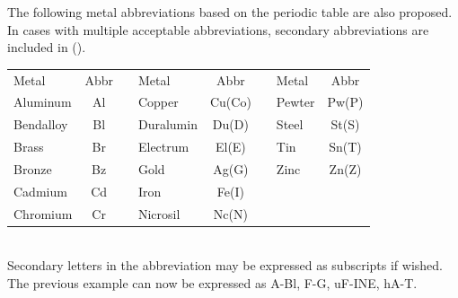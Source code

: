 \documentclass[conference]{IEEEtran}
\newcommand{\n}{\hfill\break}
\begin{document}
The following metal abbreviations based on the periodic table are also proposed.  In cases with multiple acceptable abbreviations, secondary abbreviations are included in ().\\\n
\setlength{\tabcolsep}{.5\tabcolsep}
\begin{tabular}{|l |c |c|l |c |c|l |c | }
	
	\cline{1-2}\cline{4-5}\cline{7-8}
	Metal&Abbr&&Metal&Abbr&&Metal&Abbr\\
	\cline{1-2}\cline{4-5}\cline{7-8}
	
	\cline{1-2}\cline{4-5}\cline{7-8}
	Aluminum & Al&&  Copper & Cu(Co) && 	Pewter & Pw(P) \\ 
	\cline{1-2}\cline{4-5}\cline{7-8}
	Bendalloy & Bl && Duralumin &Du(D) &&  	Steel & St(S)\\
	\cline{1-2}\cline{4-5}\cline{7-8}
	Brass & Br && Electrum& El(E) &&  Tin & Sn(T)\\
	\cline{1-2}\cline{4-5}\cline{7-8}
	Bronze & Bz &&	Gold&Ag(G)  &&Zinc & Zn(Z)  \\
	\cline{1-2}\cline{4-5}\cline{7-8}
Cadmium & Cd&&	Iron & Fe(I)  \\
	\cline{1-2}\cline{4-5}
	Chromium &Cr&& Nicrosil & Nc(N) \\
	\cline{1-2}\cline{4-5}
\end{tabular}\\

Secondary letters in the abbreviation may be expressed as subscripts if wished.
The previous example can now be expressed as A-Bl, F-G, uF-INE, hA-T.  \\
\end{document}

